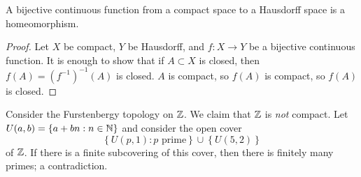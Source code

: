 \begin{corollary}
	A bijective continuous function from a compact space to a
	Hausdorff space is a homeomorphism.
\end{corollary}

\begin{proof}
	Let $X$ be compact, $Y$ be Hausdorff, and $f: X \to Y$ be a bijective
	continuous function.
	It is enough to show that if $A \subset X$ is closed, then
	$
		f(A) = \left( 
			f^{-1} 
		\right)^{-1}(A)
	$
	is closed.
	$A$ is compact, so $f(A)$ is compact, so $f(A)$ is closed.
\end{proof}

\begin{example}[]
	Consider the Furstenbergy topology on $\mathbb{Z}$.
	We claim that $\mathbb{Z}$ is \emph{not} compact.
	Let
	$
		U(a, b) = \left\{
			a + bn: n \in \mathbb{N}
		\right\}
	$
	and consider the open cover
	\[
		\left\{
			U(p,1): \text{$p$ prime}
		\right\} \cup \left\{
			U(5,2)
		\right\}
	\]
	of $\mathbb{Z}$.
	If there is a finite subcovering of this cover,
	then there is finitely many primes;
	a contradiction.
\end{example}

